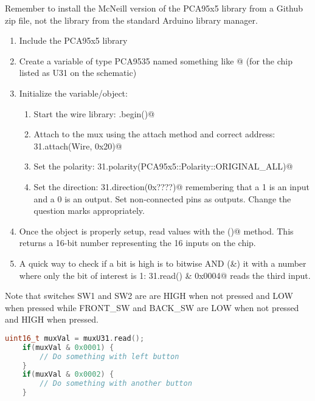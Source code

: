 Remember to install the McNeill version of the PCA95x5 library from a Github zip 
file, not the library from the standard Arduino library manager.

\begin{enumerate}
    \item Include the PCA95x5 library
    \item Create a variable of type PCA9535 named something like @ 
            (for the chip listed as U31 on the schematic)
    \item Initialize the variable/object:
    \begin{enumerate}
        \item Start the wire library: \lstinline@Wire.begin()@
        \item Attach to the mux using the attach method and correct address: 
                \lstinline@muxU31.attach(Wire, 0x20)@
        \item Set the polarity: \lstinline@muxU31.polarity(PCA95x5::Polarity::ORIGINAL_ALL)@ 
        \item Set the direction: \lstinline@muxU31.direction(0x????)@ remembering that a 1 is 
                an input and a 0 is an output. Set non-connected pins as outputs. Change the 
                question marks appropriately.
    \end{enumerate}
    \item Once the object is properly setup, read values with the \lstinline@read()@ 
            method. This returns a 16-bit number representing the 16 inputs on the chip.
    \item A quick way to check if a bit is high is to bitwise AND (\&) it with a number 
            where only the bit of interest is 1: \lstinline@mux31.read() & 0x0004@ reads 
            the third input.
\end{enumerate}

Note that switches SW1 and SW2 are are HIGH when not pressed and LOW 
when pressed while FRONT\_SW and BACK\_SW are LOW when not pressed and HIGH when pressed.

\begin{lstlisting}[language=C++, caption={The buttons attached to the PCA9535 can be accessed 
    as shown in this code snippet.},label={lst:muxButtons}]
    uint16_t muxVal = muxU31.read();
    if(muxVal & 0x0001) {
        // Do something with left button
    }
    if(muxVal & 0x0002) {
        // Do something with another button
    }
\end{lstlisting}



